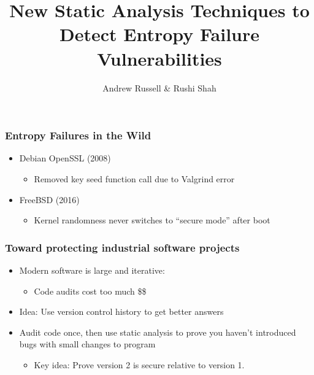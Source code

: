 \documentclass{beamer} %
\title{New Static Analysis Techniques to Detect Entropy Failure Vulnerabilities}
\author{Andrew Russell \& Rushi Shah}
\institute{The University of Texas at Austin}
\theoremstyle{definition} %
\begin{document}
\begin{frame}
\titlepage
\end{frame}

\begin{frame}
\frametitle{Entropy Failures in the Wild}
     \begin{itemize} 
        \item Debian OpenSSL (2008)
        \begin{itemize}
            \item Removed key seed function call due to Valgrind error
        \end{itemize}

        \pause

        \item FreeBSD (2016)
        \begin{itemize}
            \item Kernel randomness never switches to ``secure mode'' after boot
       \end{itemize}
	 \end{itemize}
\end{frame}

\begin{frame}
\frametitle{Toward protecting industrial software projects}
\begin{itemize}
    \item Modern software is large and iterative:
    \begin{itemize}
        \item Code audits cost too much \$\$
    \end{itemize}
    \item Idea: Use version control history to get better answers
    \item Audit code once, then use static analysis to prove you haven't introduced bugs with small changes to program
    \begin{itemize}
        \item Key idea: Prove version 2 is secure relative to version 1.
    \end{itemize}

\end{itemize}
\end{frame}
\end{document}
